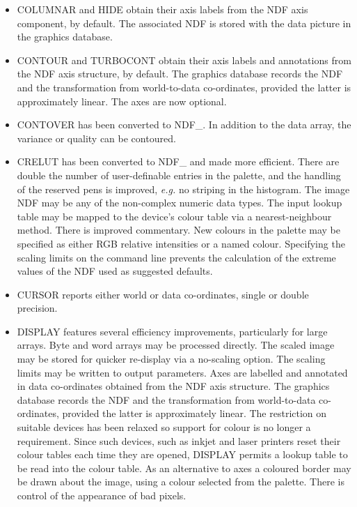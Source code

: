 {\begin{itemize}
  \item COLUMNAR and HIDE obtain their axis labels from the NDF axis
    component, by default.  The associated NDF is stored with the
    data picture in the graphics database.

  \item CONTOUR and TURBOCONT obtain their axis labels and annotations
    from the NDF axis structure, by default.  The graphics database
    records the NDF and the transformation from world-to-data
    co-ordinates, provided the latter is approximately linear.  The
    axes are now optional.

  \item CONTOVER has been converted to NDF\_.  In addition to the data
    array, the variance or quality can be contoured.

  \item CRELUT has been converted to NDF\_ and made more efficient. 
    There are double the number of user-definable entries in the
    palette, and the handling of the reserved pens is improved, {\it e.g.}
    no striping in the histogram.  The image NDF may be any of the
    non-complex numeric data types.  The input lookup table may be
    mapped to the device's colour table via a nearest-neighbour
    method. There is improved commentary.  New colours in the palette
    may be specified as either RGB relative intensities or a named
    colour.  Specifying the scaling limits on the command line
    prevents the calculation of the extreme values of the NDF used
    as suggested defaults.

  \item CURSOR reports either world or data co-ordinates, single or double
    precision.

  \item DISPLAY features several efficiency improvements, particularly
    for large arrays.  Byte and word arrays may be processed directly.
    The scaled image may be stored for quicker re-display via a
    no-scaling option.  The scaling limits may be written to output
    parameters.  Axes are labelled and annotated in data co-ordinates 
    obtained from the NDF axis structure.  The graphics database
    records the NDF and the transformation from world-to-data
    co-ordinates, provided the latter is approximately linear.  The
    restriction on suitable devices has been relaxed so support for
    colour is no longer a requirement.  Since such devices, such as
    inkjet and laser printers reset their colour tables each time they
    are opened, DISPLAY permits a lookup table to be read into the
    colour table.  As an alternative to axes a coloured border may be
    drawn about the image, using a colour selected from the palette.
    There is control of the appearance of bad pixels.


\end{itemize}}
